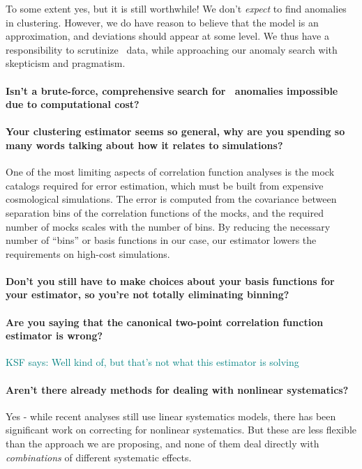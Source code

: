 \documentclass[12pt, fullpage, letterpaper]{article}
\newcommand{\KSF}[1]{\textcolor{teal}{KSF says: #1}}
\begin{document}
To some extent yes, but it is still worthwhile! We don't \emph{expect} to find anomalies in clustering. However, we do have reason to believe that the \LCDM model is an approximation, and deviations should appear at some level. We thus have a responsibility to scrutinize \LSS\ data, while approaching our anomaly search with skepticism and pragmatism. 

\paragraph{Isn't a brute-force, comprehensive search for \LSS\ anomalies impossible due to computational cost?}

\paragraph{Your clustering estimator seems so general, why are you spending so many words talking about how it relates to simulations?}

One of the most limiting aspects of correlation function analyses is the mock catalogs required for error estimation, which must be built from expensive cosmological simulations. The error is computed from the covariance between separation bins of the correlation functions of the mocks, and the required number of mocks scales with the number of bins. By reducing the necessary number of ``bins'' or basis functions in our case, our estimator lowers the requirements on high-cost simulations.

\paragraph{Don't you still have to make choices about your basis functions for your estimator, so you're not totally eliminating binning?}

\paragraph{Are you saying that the canonical two-point correlation function estimator is wrong?} \KSF{Well kind of, but that's not what this estimator is solving}

\paragraph{Aren't there already methods for dealing with nonlinear systematics?} Yes - while recent analyses still use linear systematics models, there has been significant work on correcting for nonlinear systematics. But these are less flexible than the approach we are proposing, and none of them deal directly with \emph{combinations} of different systematic effects.
\end{document}
